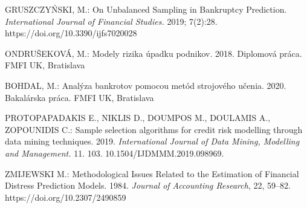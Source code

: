 \begin{thebibliography}{99}

     GRUSZCZYŃSKI, M.: On Unbalanced Sampling in Bankruptcy Prediction. \emph{International Journal of Financial Studies.} 2019; 7(2):28. https://doi.org/10.3390/ijfs7020028

     ONDRUŠEKOVÁ, M.: Modely rizika úpadku podnikov. 2018. Diplomová práca. FMFI UK, Bratislava
    
     BOHDAL, M.: Analýza bankrotov pomocou metód strojového učenia. 2020. Bakalárska práca. FMFI UK, Bratislava

     PROTOPAPADAKIS E., NIKLIS D., DOUMPOS M., DOULAMIS A., ZOPOUNIDIS C.: Sample selection algorithms for credit risk modelling through data mining techniques. 2019.
    \emph{International Journal of Data Mining, Modelling and Management.} 11. 103. 10.1504/IJDMMM.2019.098969.

     ZMIJEWSKI M.: Methodological Issues Related to the Estimation of Financial Distress Prediction Models. 1984. \emph{Journal of Accounting Research}, 22, 59–82. https://doi.org/10.2307/2490859

\end{thebibliography}
